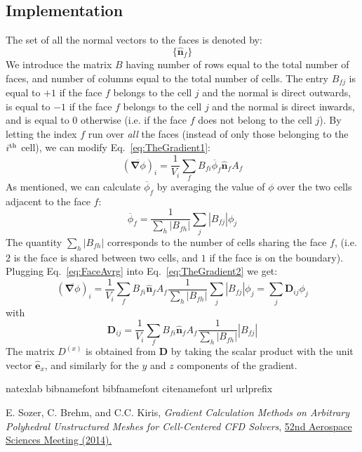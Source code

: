\documentclass[]{article}
\newcommand{\bs}[1]{\boldsymbol{#1}}
\newcommand{\Eq}[1]{\begin{equation}#1\end{equation}}
\begin{document}
\subsection*{Implementation}
The set of all the normal vectors to the faces is denoted by:
\Eq{\{ \hat{\bs{n}}_f\}  }
We introduce the matrix $B$ having number of rows equal to the total number of faces, and number of columns equal to the total number of cells. The entry $B_{f j}$ is equal to $+1$ if the face $f$ belongs to the cell $j$ and the normal is direct outwards, is equal to  $-1$ if the face $f$ belongs to the cell $j$ and the normal is direct inwards,  and is equal to $0$ otherwise (i.e. if the face $f$ does not belong to the cell $j$).
By letting the index $f$ run over \emph{all} the faces (instead of only those belonging to the $i^{\text{\scriptsize th}}$ cell), we can modify Eq.~\ref{eq:TheGradient1}:
 \Eq{(\overline{ \bs{\nabla}\phi})_i =  \frac{1}{V_i} \sum_f B_{fi}  \overline{\phi}_f  \hat{\bs{n}}_f A_f \label{eq:TheGradient2}}
As mentioned, we can calculate  $\overline{\phi}_f $ by averaging the value of $\phi$ over the two cells adjacent to the face $f$:
\Eq{ \overline{\phi}_f  = \frac{1}{\sum_h |B_{fh}|}\sum_j |B_{fj}| \phi_j \label{eq:FaceAvrg}}
The quantity $\sum_h |B_{fh}|$ corresponds to the number of cells sharing the face $f$, (i.e. $2$ is the face is shared between two cells, and $1$ if the face is on the boundary).
Plugging Eq.~\ref{eq:FaceAvrg} into Eq.~\ref{eq:TheGradient2} we get:
 \Eq{(\overline{ \bs{\nabla}\phi})_i =  \frac{1}{V_i} \sum_f B_{fi} \hat{\bs{n}}_f A_f  \frac{1}{\sum_h |B_{fh}|}\sum_j |B_{fj}| \phi_j  = \sum_j \bs{D}_{ij}\phi_j }
with
 \Eq{  \bs{D}_{ij}  =  \frac{1}{V_i} \sum_f B_{fi} \hat{\bs{n}}_f A_f  \frac{1}{\sum_h |B_{fh}|}| B_{fj} |}
The matrix $D^{(x)}$ is obtained from $ \bs{D}$ by taking the scalar product with the unit vector $\hat{\bs{e}}_x$, and similarly for the $y$ and $z$ components of the gradient.

\begin{thebibliography}{19}

\expandafter\ifx\csname natexlab\endcsname\relax\def\natexlab#1{#1}\fi
\expandafter\ifx\csname bibnamefont\endcsname\relax
  \def\bibnamefont#1{#1}\fi
\expandafter\ifx\csname bibfnamefont\endcsname\relax
  \def\bibfnamefont#1{#1}\fi
\expandafter\ifx\csname citenamefont\endcsname\relax
  \def\citenamefont#1{#1}\fi
\expandafter\ifx\csname url\endcsname\relax
  \def\url#1{\texttt{#1}}\fi
\expandafter\ifx\csname urlprefix\endcsname\relax\def\urlprefix{URL }\fi
\providecommand{\bibinfo}[2]{#2}
\providecommand{\eprint}[2][]{\url{#2}}


\bibinfo{author}{\bibfnamefont{E. Sozer}},
\bibinfo{author}{\bibfnamefont{C. Brehm}},
\bibnamefont{and}
\bibinfo{author}{\bibfnamefont{C.C. Kiris}},
\emph{\bibinfo{title}{Gradient Calculation Methods on Arbitrary Polyhedral Unstructured Meshes for Cell-Centered CFD Solvers}},
\href{http://dx.doi.org/10.2514/6.2014-1440}{
\bibinfo{journal}{52nd Aerospace Sciences Meeting} 
(\bibinfo{year}{2014}).}

\end{thebibliography}
\end{document}
